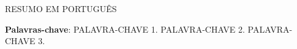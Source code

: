 \begin{resumo}
	RESUMO EM PORTUGUÊS

	\vspace*{1\onelineskip}

	\textbf{Palavras-chave}: PALAVRA-CHAVE 1. PALAVRA-CHAVE 2. PALAVRA-CHAVE 3.
\end{resumo}